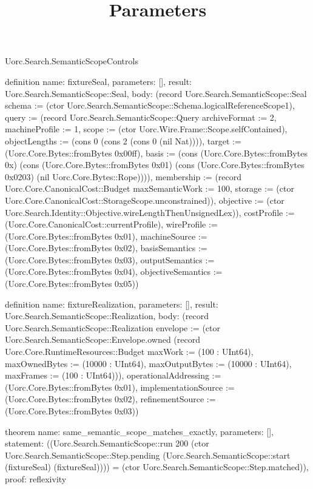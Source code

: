 \begin{lexlean}{Uorc.Search.SemanticScopeControls}
\title{Parameters}
\begin{semanticmodule}
definition{
  name: fixtureSeal,
  parameters: [],
  result: Uorc.Search.SemanticScope::Seal,
  body: (record Uorc.Search.SemanticScope::Seal {schema := (ctor Uorc.Search.SemanticScope::Schema.logicalReferenceScope1), query := (record Uorc.Search.SemanticScope::Query {archiveFormat := 2, machineProfile := 1, scope := (ctor Uorc.Wire.Frame::Scope.selfContained), objectLengths := (cons 0 (cons 2 (cons 0 (nil Nat)))), target := (Uorc.Core.Bytes::fromBytes 0x00ff), basis := (cons (Uorc.Core.Bytes::fromBytes 0x) (cons (Uorc.Core.Bytes::fromBytes 0x01) (cons (Uorc.Core.Bytes::fromBytes 0x0203) (nil Uorc.Core.Bytes::Rope)))), membership := (record Uorc.Core.CanonicalCost::Budget {maxSemanticWork := 100, storage := (ctor Uorc.Core.CanonicalCost::StorageScope.unconstrained)}), objective := (ctor Uorc.Search.Identity::Objective.wireLengthThenUnsignedLex)}), costProfile := (Uorc.Core.CanonicalCost::currentProfile), wireProfile := (Uorc.Core.Bytes::fromBytes 0x01), machineSource := (Uorc.Core.Bytes::fromBytes 0x02), basisSemantics := (Uorc.Core.Bytes::fromBytes 0x03), outputSemantics := (Uorc.Core.Bytes::fromBytes 0x04), objectiveSemantics := (Uorc.Core.Bytes::fromBytes 0x05)})
}

definition{
  name: fixtureRealization,
  parameters: [],
  result: Uorc.Search.SemanticScope::Realization,
  body: (record Uorc.Search.SemanticScope::Realization {envelope := (ctor Uorc.Search.SemanticScope::Envelope.owned (record Uorc.Core.RuntimeResources::Budget {maxWork := (100 : UInt64), maxOwnedBytes := (10000 : UInt64), maxOutputBytes := (10000 : UInt64), maxFrames := (100 : UInt64)})), operationalAddressing := (Uorc.Core.Bytes::fromBytes 0x01), implementationSource := (Uorc.Core.Bytes::fromBytes 0x02), refinementSource := (Uorc.Core.Bytes::fromBytes 0x03)})
}

theorem{
  name: same_semantic_scope_matches_exactly,
  parameters: [],
  statement: ((Uorc.Search.SemanticScope::run 200 (ctor Uorc.Search.SemanticScope::Step.pending (Uorc.Search.SemanticScope::start (fixtureSeal) (fixtureSeal)))) = (ctor Uorc.Search.SemanticScope::Step.matched)),
  proof: reflexivity{}
}


\end{semanticmodule}
\end{lexlean}

